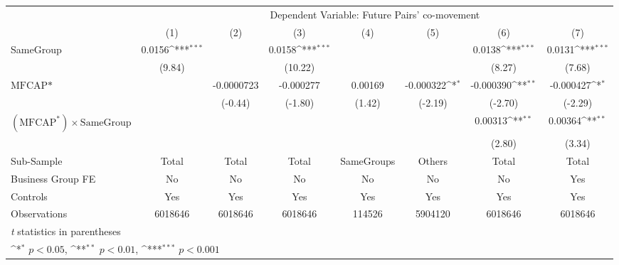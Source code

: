 {
\def\sym#1{\ifmmode^{#1}\else\(^{#1}\)\fi}
\begin{tabular}{l*{7}{c}}
\hline\hline
                &\multicolumn{7}{c}{Dependent Variable: Future Pairs' co-movement}                                                                   \\\cmidrule(lr){2-8}
                &\multicolumn{1}{c}{(1)}         &\multicolumn{1}{c}{(2)}         &\multicolumn{1}{c}{(3)}         &\multicolumn{1}{c}{(4)}         &\multicolumn{1}{c}{(5)}         &\multicolumn{1}{c}{(6)}         &\multicolumn{1}{c}{(7)}         \\
\hline
SameGroup       &   0.0156\sym{***}&                  &   0.0158\sym{***}&                  &                  &   0.0138\sym{***}&   0.0131\sym{***}\\
                &   (9.84)         &                  &  (10.22)         &                  &                  &   (8.27)         &   (7.68)         \\
[1em]
$ \text{MFCAP*} $&                  &-0.0000723         &-0.000277         &  0.00169         &-0.000322\sym{*}  &-0.000390\sym{**} &-0.000427\sym{*}  \\
                &                  &  (-0.44)         &  (-1.80)         &   (1.42)         &  (-2.19)         &  (-2.70)         &  (-2.29)         \\
[1em]
 $ (\text{MFCAP}^*) \times {\text{SameGroup} }  $ &                  &                  &                  &                  &                  &  0.00313\sym{**} &  0.00364\sym{**} \\
                &                  &                  &                  &                  &                  &   (2.80)         &   (3.34)         \\
\hline
Sub-Sample      &    Total         &    Total         &    Total         &SameGroups         &   Others         &    Total         &    Total         \\
Business Group FE&       No         &       No         &       No         &       No         &       No         &       No         &      Yes         \\
Controls        &      Yes         &      Yes         &      Yes         &      Yes         &      Yes         &      Yes         &      Yes         \\
Observations    &  6018646         &  6018646         &  6018646         &   114526         &  5904120         &  6018646         &  6018646         \\
\hline\hline
\multicolumn{8}{l}{\footnotesize \textit{t} statistics in parentheses}\\
\multicolumn{8}{l}{\footnotesize \sym{*} \(p<0.05\), \sym{**} \(p<0.01\), \sym{***} \(p<0.001\)}\\
\end{tabular}
}
